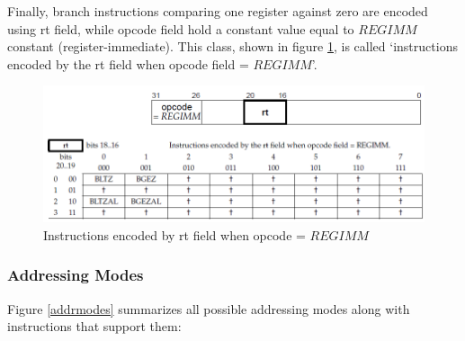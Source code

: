 \documentclass[]{scrartcl}
\begin{document}
Finally, branch instructions comparing one register against zero are
encoded using rt field, while opcode field hold a constant value
equal to $REGIMM$ constant (register-immediate).
This class, shown in figure \ref{encoding3}, is called `instructions
encoded by the rt field when opcode field = $REGIMM$'.\\

\begin{figure}[H]
\begin{center}
\includegraphics[width=\textwidth]{encoding3.png}
\end{center}
\caption{Instructions encoded by rt field when opcode = $REGIMM$}
\label{encoding3}
\end{figure}

\subsubsection{Addressing Modes}

Figure \ref{addrmodes} summarizes all possible addressing modes
along with instructions that support them:
\end{document}
